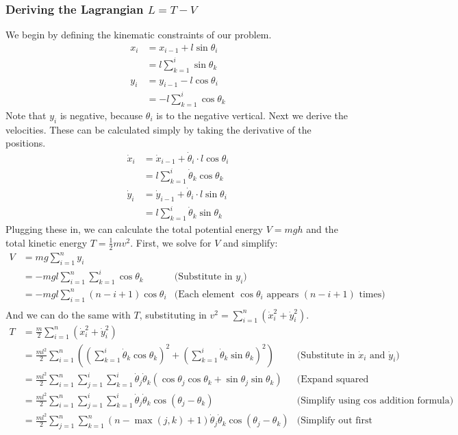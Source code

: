 \documentclass{article}
\begin{document}
\subsubsection{Deriving the Lagrangian \texorpdfstring{$L=T-V$}{L=T-V}}
We begin by defining the kinematic constraints of our problem.
\begin{align*}
	x_i &= x_{i-1} + l\sin{\theta_i}\\
	&= l\sum_{k=1}^i\sin{\theta_k}\\
	y_i &= y_{i-1} - l\cos{\theta_i}\\
	&= -l\sum_{k=1}^i\cos{\theta_k}
\end{align*}
Note that $y_i$ is negative, because $\theta_i$ is to the negative vertical. Next we derive the velocities. These can be calculated simply by taking the derivative of the positions.
\begin{align*}
	\dot x_i &= \dot x_{i-1} + \dot\theta_i \cdot l\cos{\theta_i}\\
	&= l\sum_{k=1}^i\dot\theta_k\cos{\theta_k}\\
	\dot y_i &= \dot y_{i-1} + \dot\theta_i \cdot l\sin{\theta_i}\\
	&= l\sum_{k=1}^i\dot\theta_k\sin{\theta_k}
\end{align*}
Plugging these in, we can calculate the total potential energy $V=mgh$ and the total kinetic energy $T=\frac{1}{2}mv^2$. First, we solve for $V$ and simplify:
\begin{align*}
	V &= mg\sum_{i=1}^n y_i \\
	&=-mgl\sum_{i=1}^n\sum_{k=1}^i\cos\theta_k
	&\text{(Substitute in $y_i$)}\\
	&=-mgl\sum_{i=1}^n (n-i+1)\cos\theta_i
	&\text{(Each element $\cos\theta_i$ appears $(n-i+1)$ times)}\\
\end{align*}
And we can do the same with $T$, substituting in $v^2=\sum_{i=1}^n\left(\dot{x}_i^2+\dot{y}_i^2\right)$.
\begin{align*}
	T &= \frac{m}{2}\sum_{i=1}^n \left(\dot{x}_i^2+\dot{y}_i^2\right)\\
	&= \frac{ml^2}{2}\sum_{i=1}^n \left(\left(\sum_{k=1}^i\dot\theta_k\cos{\theta_k}\right)^2+\left(\sum_{k=1}^i\dot\theta_k\sin{\theta_k}\right)^2\right)
	&\text{(Substitute in $\dot x_i$ and $\dot y_i$)}\\
	&= \frac{ml^2}{2}\sum_{i=1}^n \sum_{j=1}^i\sum_{k=1}^i\dot\theta_j\dot\theta_k\left(\cos{\theta_j}\cos{\theta_k}+\sin{\theta_j}\sin{\theta_k}\right)
	&\text{(Expand squared sums)}\\
	&= \frac{ml^2}{2}\sum_{i=1}^n \sum_{j=1}^i\sum_{k=1}^i\dot\theta_j\dot\theta_k\cos(\theta_j-\theta_k)
	&\text{(Simplify using $\cos$ addition formula)}\\
	&= \frac{ml^2}{2} \sum_{j=1}^n\sum_{k=1}^n(n-\max(j,k)+1)\dot\theta_j\dot\theta_k\cos(\theta_j-\theta_k)
	&\text{(Simplify out first sum)}\\
\end{align*}
\end{document}
